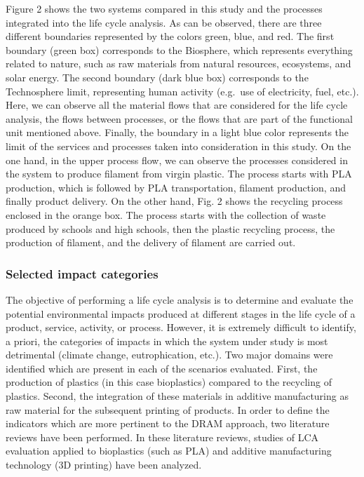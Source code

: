 \documentclass[]{elsarticle} %
\begin{document}
Figure 2 shows the two systems compared in this study and the processes integrated into the life cycle analysis. As can be observed, there are three different boundaries represented by the colors green, blue, and red. The first boundary (green box) corresponds to the Biosphere, which represents everything related to nature, such as raw materials from natural resources, ecosystems, and solar energy. The second boundary (dark blue box) corresponds to the Technosphere limit, representing human activity (e.g.~use of electricity, fuel, etc.). Here, we can observe all the material flows that are considered for the life cycle analysis, the flows between processes, or the flows that are part of the functional unit mentioned above. Finally, the boundary in a light blue color represents the limit of the services and processes taken into consideration in this study. On the one hand, in the upper process flow, we can observe the processes considered in the system to produce filament from virgin plastic. The process starts with PLA production, which is followed by PLA transportation, filament production, and finally product delivery. On the other hand, Fig. 2 shows the recycling process enclosed in the orange box. The process starts with the collection of waste produced by schools and high schools, then the plastic recycling process, the production of filament, and the delivery of filament are carried out.

\hypertarget{selected-impact-categories}{%
\subsubsection{Selected impact categories}\label{selected-impact-categories}}

The objective of performing a life cycle analysis is to determine and evaluate the potential environmental impacts produced at different stages in the life cycle of a product, service, activity, or process. However, it is extremely difficult to identify, a priori, the categories of impacts in which the system under study is most detrimental (climate change, eutrophication, etc.).
Two major domains were identified which are present in each of the scenarios evaluated. First, the production of plastics (in this case bioplastics) compared to the recycling of plastics. Second, the integration of these materials in additive manufacturing as raw material for the subsequent printing of products.
In order to define the indicators which are more pertinent to the DRAM approach, two literature reviews have been performed. In these literature reviews, studies of LCA evaluation applied to bioplastics (such as PLA) and additive manufacturing technology (3D printing) have been analyzed.
\end{document}
